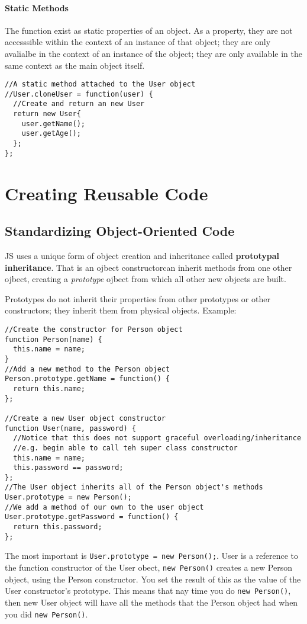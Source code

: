 \documentclass[a4paper,11pt]{book}
\begin{document}
\subsubsection{Static Methods}
The function exist as static properties of an object. As a property, they are
not accesssible within the context of an instance of that object; they are only
avalialbe in the context of an instance of the object; they are only available
in the same context as the main object itself.
\begin{verbatim}
//A static method attached to the User object
//User.cloneUser = function(user) {
  //Create and return an new User
  return new User{
    user.getName();
    user.getAge();
  };
};

\end{verbatim}
\chapter{Creating Reusable Code}
\section{Standardizing Object-Oriented Code}
JS uses a unique form of object creation and inheritance called
\textbf{prototypal inheritance}. That is an ojbect constructorcan inherit
methods from one other ojbect, creating a \emph{prototype} ojbect from which all
other new objects are built.

Prototypes do not inherit their properties from other prototypes or other
constructors; they inherit them from physical objects. Example:
\begin{verbatim}
//Create the constructor for Person object
function Person(name) {
  this.name = name;
}
//Add a new method to the Person object
Person.prototype.getName = function() {
  return this.name;
};

//Create a new User object constructor
function User(name, password) {
  //Notice that this does not support graceful overloading/inheritance
  //e.g. begin able to call teh super class constructor
  this.name = name;
  this.password == password;
};
//The User object inherits all of the Person object's methods
User.prototype = new Person();
//We add a method of our own to the user object
User.prototype.getPassword = function() {
  return this.password;
};
\end{verbatim}
The most important is \verb|User.prototype = new Person();|. User is a reference
to the function constructor of the User obect, \verb|new Person()| creates a new
Person object, using the Person constructor. You set the result of this as the
value of the User constructor's prototype. This means that nay time you do
\verb|new Person()|, then new User object will have all the methods that the
Person object had when you did \verb|new Person()|. 
\end{document}
